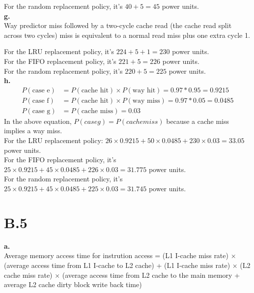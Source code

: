 \documentclass{article}
\begin{document}
\indent For the random replacement policy, it's $40+5=45$ power units.\\

\noindent\textbf{g.}\\
\indent Way predictor miss followed by a two-cycle cache read (the cache read split across two cycles) miss is equivalent to a normal read miss plus one extra cycle 1.

\indent For the LRU replacement policy, it's $224+5+1=230$ power units.\\

\indent For the FIFO replacement policy, it's $221+5=226$ power units.\\

\indent For the random replacement policy, it's $220+5=225$ power units.\\

\noindent\textbf{h.}\\
\begin{align*}
  P(\text{case e}) &= P(\text{cache hit})\times P(\text{way hit})=0.97*0.95=0.9215\\
  P(\text{case f}) &= P(\text{cache hit})\times P(\text{way miss})=0.97*0.05=0.0485\\
  P(\text{case g}) &= P(\text{cache miss})=0.03
\end{align*}
In the above equation, $P(case g) = P(cache miss)$ because a cache miss implies a way miss.\\
\indent For the LRU replacement policy: $26\times 0.9215+50\times 0.0485+230\times 0.03=33.05$ power units.\\

\indent For the FIFO replacement policy, it's $25\times 0.9215+45\times 0.0485+226\times 0.03=31.775$ power units.\\

\indent For the random replacement policy, it's $25\times 0.9215+45\times 0.0485+225\times 0.03=31.745$ power units.\\

\section{B.5}

\noindent\textbf{a.}\\
\indent Average memory access time for instrution access = (L1 I-cache miss rate) $\times$ (average access time from L1 I-cache to L2 cache) + (L1 I-cache miss rate) $\times$ (L2 cache miss rate) $\times$ (average access time from L2 cache to the main memory + average L2 cache dirty block write back time)\\
\end{document}
